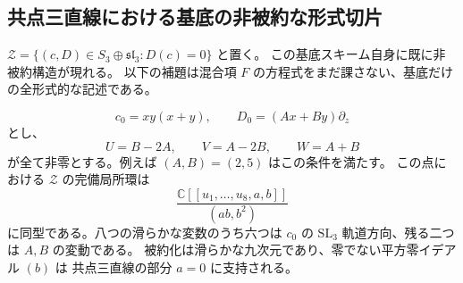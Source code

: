 \subsection{共点三直線における基底の非被約な形式切片}
\label{subsec:concurrent-base-v32}

$\mathscr Z=\{(c,D)\in S_3\oplus\mathfrak{sl}_3:D(c)=0\}$ と置く。
この基底スキーム自身に既に非被約構造が現れる。
以下の補題は混合項 $F$ の方程式をまだ課さない、基底だけの全形式的な記述である。

\begin{lemma}[共点三直線の基底切片]
\label{lem:concurrent-base-v32}
\[
 c_0=xy(x+y),\qquad D_0=(Ax+By)\partial_z
\]
とし、
\[
 U=B-2A,\qquad V=A-2B,\qquad W=A+B
\]
が全て非零とする。例えば $(A,B)=(2,5)$ はこの条件を満たす。
この点における $\mathscr Z$ の完備局所環は
\[
 \frac{\mathbb C[[u_1,\ldots,u_8,a,b]]}{(ab,b^2)}
\]
に同型である。八つの滑らかな変数のうち六つは $c_0$ の
$\mathrm{SL}_3$ 軌道方向、残る二つは $A,B$ の変動である。
被約化は滑らかな九次元であり、零でない平方零イデアル $(b)$ は
共点三直線の部分 $a=0$ に支持される。
\end{lemma}

